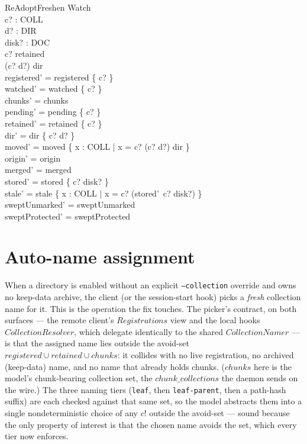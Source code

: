 \documentclass[a4paper]{article}
\begin{document}
\begin{schema}{ReAdoptFreshen}
  \Delta Watch \\
  c? : COLL \\
  d? : DIR \\
  disk? : \power DOC \\
  \where
  c? \in retained \\
  (c? \mapsto d?) \in dir \\
  registered' = registered \cup \{ c? \} \\
  watched' = watched \cup \{ c? \} \\
  chunks' = chunks \\
  pending' = pending \setminus \{ c? \} \\
  retained' = retained \setminus \{ c? \} \\
  dir' = dir \oplus \{ c? \mapsto d? \} \\
  moved' = moved \cup \{ x : COLL | x = c? \land (c? \mapsto d?) \notin dir \} \\
  origin' = origin \\
  merged' = merged \\
  stored' = stored \oplus \{ c? \mapsto disk? \} \\
  stale' = stale \cup \{ x : COLL | x = c? \land \lnot (stored'~c? \subseteq disk?) \} \\
  sweptUnmarked' = sweptUnmarked \\
  sweptProtected' = sweptProtected
\end{schema}

\section{Auto-name assignment}

When a directory is enabled without an explicit \texttt{--collection} override
and owns no keep-data archive, the client (or the session-start hook) picks a
\textit{fresh} collection name for it.  This is the operation the fix touches.
The picker's contract, on both surfaces --- the remote client's $Registrations$
view and the local hooks $CollectionResolver$, which delegate identically to the
shared $CollectionNamer$ --- is that the assigned name lies outside the avoid-set
$registered \cup retained \cup chunks$: it collides with no live registration, no
archived (keep-data) name, and no name that already holds chunks.  ($chunks$ here
is the model's chunk-bearing collection set, the $chunk\_collections$ the daemon
sends on the wire.)  The three naming tiers (\texttt{leaf}, then \texttt{leaf-parent}, then a
path-hash suffix) are each checked against that same set, so the model abstracts
them into a single nondeterministic choice of any $c!$ outside the avoid-set ---
sound because the only property of interest is that the chosen name avoids the
set, which every tier now enforces.
\end{document}
